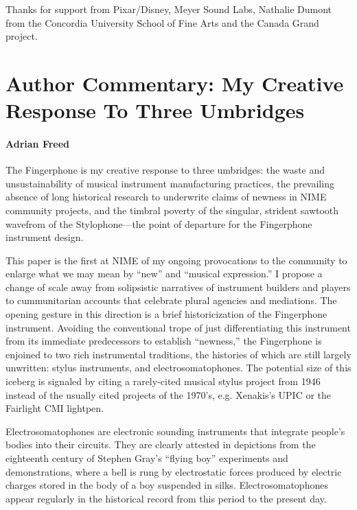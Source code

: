 \begin{acknowledgement}
Thanks for support from Pixar/Disney, Meyer Sound Labs, Nathalie Dumont from the
Concordia University School of Fine Arts and the Canada Grand project.
\end{acknowledgement}


\section*{Author Commentary: My Creative Response To Three Umbridges}

\paragraph{Adrian Freed}

The Fingerphone is my creative response to three umbridges: the waste and unsustainability of musical instrument manufacturing practices, the prevailing absence of long historical research to underwrite claims of newness in NIME community projects, and the timbral poverty of the singular, strident sawtooth wavefrom of the Stylophone---the point of departure for the Fingerphone instrument design.
 
This paper is the first at NIME of my ongoing provocations to the community to enlarge what we may mean by ``new'' and ``musical expression.''  I propose a change of  scale away from  solipsistic narratives of instrument builders and players to cummunitarian accounts that celebrate plural agencies and mediations. %
The opening gesture in this direction is a brief historicization of the Fingerphone instrument. Avoiding the conventional trope of just differentiating this instrument from its immediate predecessors to establish ``newness,'' the Fingerphone is enjoined to two rich instrumental traditions, the histories of which are still largely unwritten: stylus instruments, and electrosomatophones.  The potential size of this iceberg is signaled by citing a rarely-cited musical stylus project from 1946 instead of the usually cited projects of the 1970's, e.g. Xenakis's UPIC or the Fairlight CMI lightpen.
 
Electrosomatophones are electronic sounding instruments that integrate people's bodies into their circuits. They are clearly attested in depictions from the eighteenth century of Stephen Gray's ``flying boy'' experiments and demonstrations, where a bell is rung by electrostatic forces produced by electric charges stored in the body of a boy suspended in silks.  Electrosomatophones appear regularly in the historical record from this period to the present day.
 
